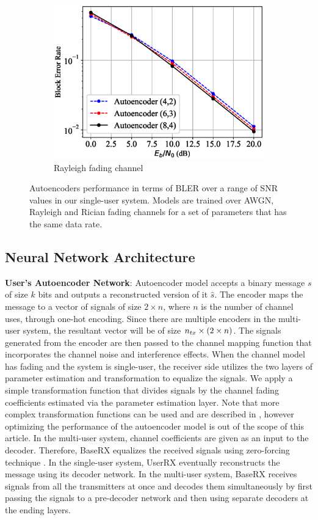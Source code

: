 \begin{figure}[!tp]
\begin{subfigure}{0.28\textwidth}
		\includegraphics[width=\linewidth]{figs/autoencoder_bler_rayleigh}
		\caption{Rayleigh fading channel}	
	\end{subfigure}
	\caption{Autoencoders performance in terms of BLER over a range of SNR values in our single-user system. Models are trained over AWGN, Rayleigh and Rician fading channels for a set of parameters that has the same data rate.}
	\label{fig:autoencoder_bler}
\end{figure}

\subsection{Neural Network Architecture}
\textbf{User's Autoencoder Network}: Autoencoder model accepts a binary message \(s\) of size \(k\) bits and outputs a reconstructed version of it \(\hat{s}\). The encoder maps the message to a vector of signals of size \(2 \times n\), where \(n\) is the number of channel uses, through one-hot encoding. Since there are multiple encoders in the multi-user system, the resultant vector will be of size \(n_{tx} \time 2 \times (2 \times n)\). The signals generated from the encoder are then passed to the channel mapping function that incorporates the channel noise and interference effects. When the channel model has fading and the system is single-user, the receiver side utilizes the two layers of parameter estimation and transformation to equalize the signals. We apply a simple transformation function that divides signals by the channel fading coefficients estimated via the parameter estimation layer. Note that more complex transformation functions can be used and are described in \cite{o2017introduction}, however optimizing the performance of the autoencoder model is out of the scope of this article. In the multi-user system, channel coefficients are given as an input to the decoder. Therefore, BaseRX equalizes the received signals using zero-forcing technique \cite{garg2010wireless}. In the single-user system, UserRX eventually reconstructs the message using its decoder network. In the multi-user system, BaseRX receives signals from all the transmitters at once and decodes them simultaneously by first passing the signals to a pre-decoder network and then using separate decoders at the ending layers.



